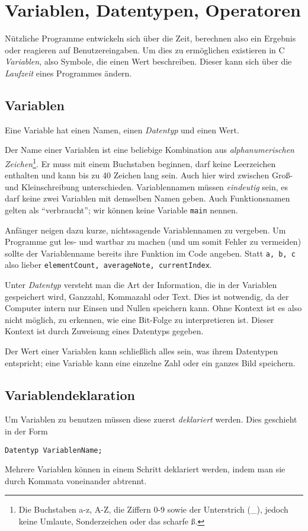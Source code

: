 \section{Variablen, Datentypen, Operatoren} \label{sec:expressions}
Nützliche Programme entwickeln sich über die Zeit, berechnen also \eg ein Ergebnis oder reagieren auf Benutzereingaben. Um dies zu ermöglichen existieren in C \emph{Variablen}, also Symbole, die einen Wert beschreiben. Dieser kann sich über die \emph{Laufzeit} eines Programmes ändern.

\subsection{Variablen}
Eine Variable hat einen Namen, einen \emph{Datentyp} und einen Wert.

Der Name einer Variablen ist eine beliebige Kombination aus \emph{alphanumerischen Zeichen}\footnote{Die Buchstaben a-z, A-Z, die Ziffern 0-9 sowie der Unterstrich (\_), jedoch keine Umlaute, Sonderzeichen oder das scharfe ß.}. Er muss mit einem Buchstaben beginnen, darf keine Leerzeichen enthalten und kann bis zu 40 Zeichen lang sein. Auch hier wird zwischen Groß- und Kleinschreibung unterschieden. Variablennamen müssen \emph{eindeutig} sein, \ie es darf keine zwei Variablen mit demselben Namen geben. Auch Funktionsnamen gelten als \enquote{verbraucht}; wir können keine Variable \texttt{main} nennen.

Anfänger neigen dazu kurze, nichtssagende Variablennamen zu vergeben. Um Programme gut les- und wartbar zu machen (und um somit Fehler zu vermeiden) sollte der Variablenname bereits ihre Funktion im Code angeben. Statt \texttt{a, b, c} also lieber \texttt{elementCount, averageNote, currentIndex}.

Unter \emph{Datentyp} versteht man die Art der Information, die in der Variablen gespeichert wird, \eg Ganzzahl, Kommazahl oder Text. Dies ist notwendig, da der Computer intern nur Einsen und Nullen speichern kann. Ohne Kontext ist es also nicht möglich, zu erkennen, wie eine Bit-Folge zu interpretieren ist. Dieser Kontext ist durch Zuweisung eines Datentyps gegeben.

Der Wert einer Variablen kann schließlich alles sein, was ihrem Datentypen entspricht; eine Variable kann \eg eine einzelne Zahl oder ein ganzes Bild speichern.

\subsection{Variablendeklaration} \label{sec:DeclareVars}
Um Variablen zu benutzen müssen diese zuerst \emph{deklariert} werden. Dies geschieht in der Form
\begin{codebox}
\texttt{Datentyp VariablenName;}
\end{codebox}
Mehrere Variablen können in einem Schritt deklariert werden, indem man sie durch Kommata voneinander abtrennt.

